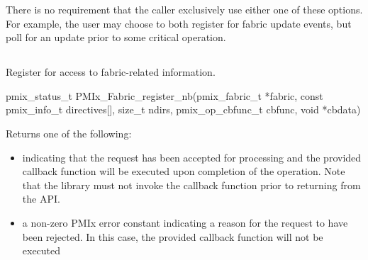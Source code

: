 There is no requirement that the caller exclusively use either one of these options. For example, the user may choose to both register for fabric update events, but poll for an update prior to some critical operation.

\subsection{}

\summary

Register for access to fabric-related information.

\format

\cspecificstart
\begin{codepar}
pmix_status_t
PMIx_Fabric_register_nb(pmix_fabric_t *fabric,
                        const pmix_info_t directives[],
                        size_t ndirs,
                        pmix_op_cbfunc_t cbfunc, void *cbdata)
\end{codepar}
\cspecificend

\begin{arglist}
\end{arglist}

Returns one of the following:

\begin{itemize}
\item {} indicating that the request has been accepted for processing and the provided callback function will be executed upon completion of the operation. Note that the library must not invoke the callback function prior to returning from the \ac{API}.
\item a non-zero \ac{PMIx} error constant indicating a reason for the request to have been rejected. In this case, the provided callback function will not be executed
\end{itemize}


